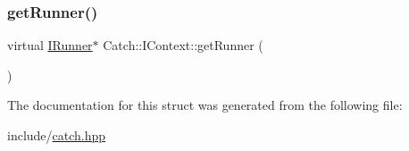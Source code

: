 \mbox{\label{struct_catch_1_1_i_context_af088415dde18d039ed5a2f95b02767c6}} 
\subsubsection{\texorpdfstring{get\+Runner()}{getRunner()}}
{\footnotesize\ttfamily virtual \mbox{\hyperlink{struct_catch_1_1_i_runner}{I\+Runner}}$\ast$ Catch\+::\+I\+Context\+::get\+Runner (\begin{DoxyParamCaption}{ }\end{DoxyParamCaption})\hspace{0.3cm}{\ttfamily [pure virtual]}}



The documentation for this struct was generated from the following file\+:\begin{DoxyCompactItemize}
\item 
include/\mbox{\hyperlink{catch_8hpp}{catch.\+hpp}}\end{DoxyCompactItemize}
